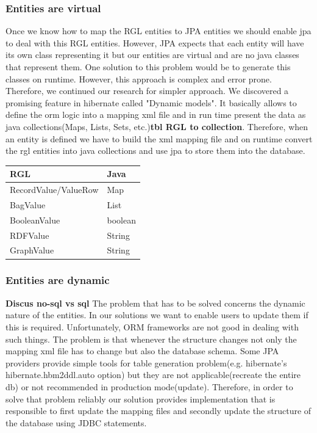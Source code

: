 \documentclass[a4paper, notitlepage]{article}
\begin{document}
\subsubsection{Entities are virtual}
Once we know how to map the RGL entities to JPA entities we should enable jpa to deal with this RGL entities. However, JPA expects that each entity will have its own class representing it but our entities are virtual and are no java classes that represent them. One solution to this problem would be to generate this classes on runtime. However, this approach is complex and error prone. Therefore, we continued our research for simpler approach. We discovered a promising feature in hibernate called "Dynamic models". It basically allows to define the orm logic into a mapping xml file and in run time present the data as java collections(Maps, Lists, Sets, etc.)\textbf{tbl RGL to collection}. Therefore, when an entity is defined we have to build the xml mapping file and on runtime convert the rgl entities into java collections and use jpa to store them into the database.

\begin{center}
    \begin{tabular}{ | l | l |}
    \hline
    RGL & Java  \\ \hline
    RecordValue/ValueRow & Map  \\ \hline
    BagValue & List  \\ \hline
    BooleanValue & boolean  \\ \hline
    RDFValue & String  \\ \hline
	GraphValue & String  \\ \hline

    \end{tabular}
\end{center}
 
\subsubsection{Entities are dynamic}
\textbf{Discus no-sql vs sql}
The problem that has to be solved concerns the dynamic nature of the entities. In our solutions we want to enable users to update them if this is required. Unfortunately, ORM frameworks are not good in dealing with such things. The problem is that whenever the structure changes not only the mapping xml file has to change but also the database schema. Some JPA providers provide simple tools for table generation problem(e.g. hibernate's hibernate.hbm2ddl.auto option) but they are not applicable(recreate the entire db) or not recommended in production mode(update). Therefore, in order to solve that problem reliably our solution provides implementation that is responsible to first update the mapping files and secondly update the structure of the database using JDBC statements.
\end{document}
